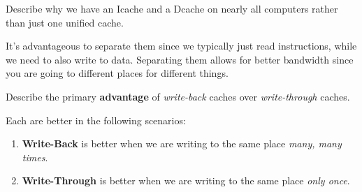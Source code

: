 \begin{problem}
  Describe why we have an Icache and a Dcache on nearly all computers rather than just one unified cache.
\end{problem}
\begin{answer}
  It's advantageous to separate them since we typically just read instructions, while we need to also write to data. Separating them allows for better bandwidth since you are going to different places for different things.
\end{answer}

\begin{problem}
  Describe the primary \textbf{advantage} of \emph{write-back} caches over \emph{write-through} caches.
\end{problem}
\begin{answer}
  Each are better in the following scenarios:
  \begin{enumerate}
    \item \textbf{Write-Back} is better when we are writing to the same place \emph{many, many times}.
    \item \textbf{Write-Through} is better when we are writing to the same place \emph{only once}.
  \end{enumerate}
\end{answer}